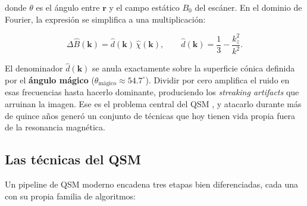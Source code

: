\documentclass[12pt, a4paper]{article}
\begin{document}
donde $\theta$ es el ángulo entre $\mathbf{r}$ y el campo estático $B_0$ del escáner. En el dominio de Fourier, la expresión se simplifica a una multiplicación:

\begin{equation}
  \Delta \hat{B}(\mathbf{k}) = \hat{d}(\mathbf{k})\,\hat{\chi}(\mathbf{k}),
  \qquad
  \hat{d}(\mathbf{k}) = \frac{1}{3} - \frac{k_z^2}{k^2}.
  \label{eq:fourier}
\end{equation}

El denominador $\hat{d}(\mathbf{k})$ se anula exactamente sobre la superficie cónica definida por el \textbf{ángulo mágico} ($\theta_{\text{mágico}} \approx 54.7^{\circ}$). Dividir por cero amplifica el ruido en esas frecuencias hasta hacerlo dominante, produciendo los \emph{streaking artifacts} que arruinan la imagen. Ese es el problema central del QSM \cite{Wharton2010COSMOS, Liu2011MEDI}, y atacarlo durante más de quince años generó un conjunto de técnicas que hoy tienen vida propia fuera de la resonancia magnética.

\subsection*{Las técnicas del QSM}

Un pipeline de QSM moderno encadena tres etapas bien diferenciadas, cada una con su propia familia de algoritmos:
\end{document}
